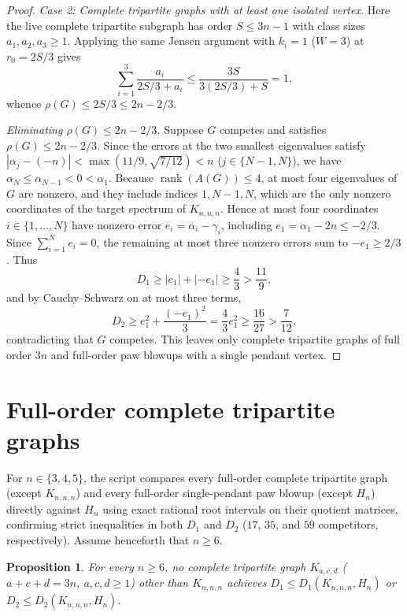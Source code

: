 \documentclass[10pt]{article}
\newtheorem{proposition}[theorem]{Proposition}
\begin{document}
\begin{proof}
\emph{Case 2: Complete tripartite graphs with at least one isolated vertex.}
Here the live complete tripartite subgraph has order $S \leq 3n - 1$ with class sizes $a_1, a_2, a_3 \geq 1$. Applying the same Jensen argument with $k_i = 1$ ($W = 3$) at $r_0 = 2S/3$ gives
\[
\sum_{i=1}^3 \frac{a_i}{2S/3 + a_i} \leq \frac{3S}{3(2S/3) + S} = 1,
\]
whence $\rho(G) \leq 2S/3 \leq 2n - 2/3$.

\emph{Eliminating $\rho(G) \leq 2n - 2/3$.}
Suppose $G$ competes and satisfies $\rho(G) \leq 2n - 2/3$. Since the errors at the two smallest eigenvalues satisfy $|\alpha_j - (-n)| < \max(11/9, \sqrt{7/12}) < n$ ($j \in \{N-1, N\}$), we have $\alpha_N \leq \alpha_{N-1} < 0 < \alpha_1$. Because $\operatorname{rank}(A(G)) \leq 4$, at most four eigenvalues of $G$ are nonzero, and they include indices $1, N-1, N$, which are the only nonzero coordinates of the target spectrum of $K_{n,n,n}$. Hence at most four coordinates $i \in \{1, \dots, N\}$ have nonzero error $e_i = \alpha_i - \gamma_i$, including $e_1 = \alpha_1 - 2n \leq -2/3$. Since $\sum_{i=1}^N e_i = 0$, the remaining at most three nonzero errors sum to $-e_1 \geq 2/3$. Thus
\[
D_1 \geq |e_1| + |-e_1| \geq \frac{4}{3} > \frac{11}{9},
\]
and by Cauchy--Schwarz on at most three terms,
\[
D_2 \geq e_1^2 + \frac{(-e_1)^2}{3} = \frac{4}{3} e_1^2 \geq \frac{16}{27} > \frac{7}{12},
\]
contradicting that $G$ competes. This leaves only complete tripartite graphs of full order $3n$ and full-order paw blowups with a single pendant vertex.
\end{proof}

\section{Full-order complete tripartite graphs}

For $n \in \{3, 4, 5\}$, the script \texttt{} compares every full-order complete tripartite graph (except $K_{n,n,n}$) and every full-order single-pendant paw blowup (except $H_n$) directly against $H_n$ using exact rational root intervals on their quotient matrices, confirming strict inequalities in both $D_1$ and $D_2$ ($17$, $35$, and $59$ competitors, respectively). Assume henceforth that $n \geq 6$.

\begin{proposition}\label{prop:tripartite}
For every $n \geq 6$, no complete tripartite graph $K_{a,c,d}$ ($a + c + d = 3n$, $a,c,d \geq 1$) other than $K_{n,n,n}$ achieves $D_1 \leq D_1(K_{n,n,n}, H_n)$ or $D_2 \leq D_2(K_{n,n,n}, H_n)$.
\end{proposition}
\end{document}
